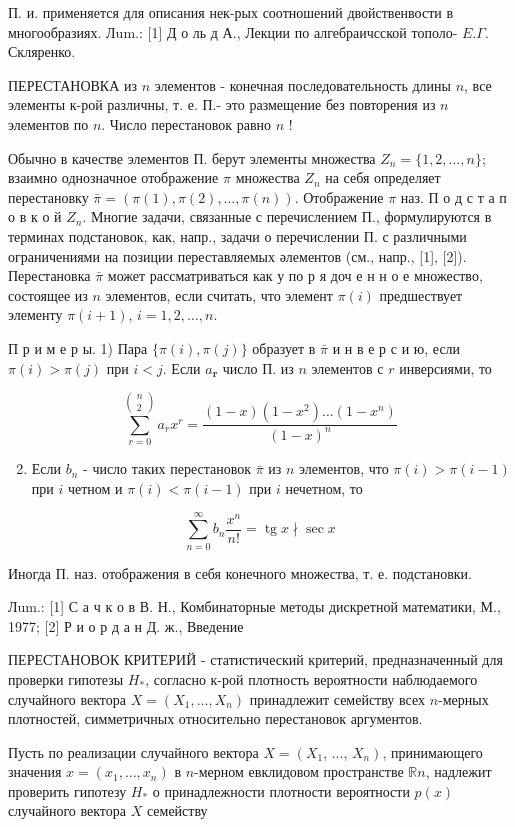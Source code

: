 \documentclass[10pt]{article}
\begin{document}
П. и. применяется для описания нек-рых соотношений двойственвости в многообразиях. Лum.: [1] Д о ль д А., Лекции по алгебраичсской тополо-
$E . \Gamma$. Скляренко.

ПЕРЕСТАНОВКА из $n$ элементов - конечная последовательность длины $n$, все элементы к-рой различны, т. е. П.- это размещение без повторения из $n$ элементов по $n$. Число перестановок равно $n$ !

Обычно в качестве элементов П. берут элементы множества $Z_{n}=\{1,2, \ldots, n\}$; взаимно однозначное отображение $\pi$ множества $Z_{n}$ на себя определяет перестановку $\bar{\pi}=(\pi(1), \pi(2), \ldots, \pi(n))$. Отображение $\pi$ наз. П о д с т а п о в к о й $Z_{n}$. Многие задачи, связанные с перечислением П., формулируются в терминах подстановок, как, напр., задачи о перечислении П. с различными ограничениями на позиции переставляемых әлементов (см., напр., [1], [2]). Перестановка $\bar{\pi}$ может рассматриваться как у по р я доч е н н о е множество, состоящее из $n$ элементов, если считать, что элемент $\pi(i)$ предшествует элементу $\pi(i+1)$, $i=1,2, \ldots, n$.

П р и м е р ы. 1) Пара $\{\pi(i), \pi(j)\}$ образует в $\bar{\pi}$ и н в е р с и ю, если $\pi(i)>\pi(j)$ при $i<j$. Если $a_{\boldsymbol{r}}$ число П. из $n$ элементов с $r$ инверсиями, то

\[
\sum_{r=0}^{\left(\begin{array}{l}
n \\
2
\end{array}\right)} a_{r} x^{r}=\frac{(1-x)\left(1-x^{2}\right) \ldots\left(1-x^{n}\right)}{(1-x)^{n}}
\]

\begin{enumerate}
  \setcounter{enumi}{1}
  \item Если $b_{n}$ - число таких перестановок $\bar{\pi}$ из $n$ элементов, что $\pi(i)>\pi(i-1)$ при $i$ четном и $\pi(i)<\pi(i-1)$ при $i$ нечетном, то
\end{enumerate}

\[
\sum_{n=0}^{\infty} b_{n} \frac{x^{n}}{n !}=\operatorname{tg} x \nmid \sec x
\]

Иногда П. наз. отображения в себя конечного множества, т. е. подстановки.

Лum.: [1] С а ч к о в В. Н., Комбинаторные методы дискретной математики, М., 1977; [2] Р и о р д а н Д. ж., Введение

ПЕРЕСТАНОВОК КРИТЕРИЙ - статистический критерий, предназначенный для проверки гипотезы $H_{*}$, согласно к-рой плотность вероятности наблюдаемого случайного вектора $X=\left(X_{1}, \ldots, X_{n}\right)$ принадлежит семейству всех $n$-мерных плотностей, симметричных относительно перестановок аргументов.

Пусть по реализации случайного вектора $X=\left(X_{1}\right.$, ..., $\left.X_{n}\right)$, принимающего значения $x=\left(x_{1}, \ldots, x_{n}\right)$ в $n$-мерном евклидовом пространстве $\mathbb{R} n$, надлежит проверить гипотезу $H_{*}$ о принадлежности плотности вероятности $p(x)$ случайного вектора $X$ семейству
\end{document}
